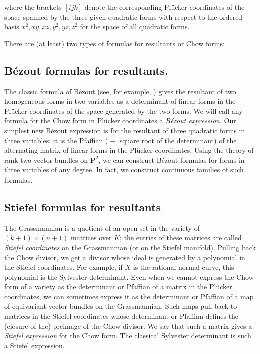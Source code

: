 \documentclass{jams-l}
\theoremstyle{definition}
\theoremstyle{remark}
\begin{document}
\noindent where the brackets $[ijk]$ denote the 
corresponding Pl\"ucker coordinates of the space spanned by the three given
quadratic forms with respect to the ordered basis $x^2,xy,xz,y^2,yz,z^2$ for
the space of all quadratic forms. 

There are (at least) two types of formulas for resultants or Chow forms:

\subsection*{B\'ezout formulas for
resultants.} The classic formula of B\'ezout (see, for example, 
\cite[Chapter 12, (1.17) and (1.18 )]{Gelfandetal.1994}) gives 
the resultant of two
homogeneous forms in two variables as a determinant of linear forms in the
Pl\"ucker coordinates of the space generated by the two forms. We will call any
formula for the Chow form in Pl\"ucker coordinates a {\it B\'ezout
expression}. Our simplest new B\'ezout expression is for the resultant of three
quadratic forms in three variables: it is the Pfaffian ($\equiv$ square root of
the determinant) of the alternating matrix of linear forms in the Pl\"ucker
coordinates. Using the theory of rank two vector bundles on ${\mathbf P}^2$, 
we can
construct B\'ezout formulas for forms in three variables of any degree. In
fact, we construct continuous families of such formulas.


\subsection*{Stiefel formulas for resultants}

The Grassmannian is a quotient of an
open set in the variety of $(k+1) \times (n+1)$ matrices over $K$; the
entries of these matrices are called {\it Stiefel coordinates} on the Grassmannian
(or on the Stiefel manifold). Pulling back the Chow divisor, we get a divisor
whose ideal is generated by a polynomial in the Stiefel coordinates. 
For example,
if $X$ is the rational normal curve, this polynomial is the Sylvester determinant.
Even when we cannot express the Chow form of a variety as the determinant or Pfaffian
of a matrix in the Pl\"ucker coordinates, we can sometimes express it as
the determinant or Pfaffian of a map of equivariant vector bundles on the 
Grassmannian. 
Such maps pull back to matrices in the Stiefel coordinates whose determinant
or Pfaffian defines the (closure of the) preimage of the Chow divisor.
We say that such a matrix gives a {\it Stiefel expression\/} for
the Chow form. The classical Sylvester determinant is such
a Stiefel expression. 
\end{document}
